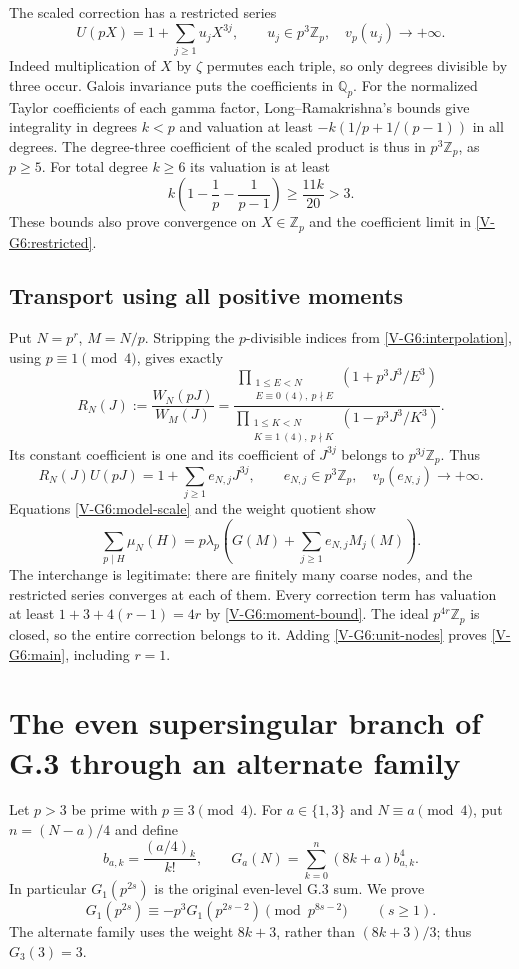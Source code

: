 \documentclass[11pt,letterpaper]{article}
\numberwithin{equation}{section}
\begin{document}
The scaled correction has a restricted series
\begin{equation}\label{V-G6:restricted}
 U(pX)=1+\sum_{j\ge1}u_jX^{3j},\qquad
 u_j\in p^3\mathbb Z_p,\quad v_p(u_j)\longrightarrow+\infty.
\end{equation}
Indeed multiplication of $X$ by $\zeta$ permutes each triple, so
only degrees divisible by three occur. Galois invariance puts the
coefficients in $\mathbb Q_p$.
For the normalized Taylor coefficients of each gamma factor,
Long--Ramakrishna's bounds give integrality in degrees $k<p$ and
valuation at least $-k(1/p+1/(p-1))$ in all degrees.
The degree-three coefficient of the scaled product is thus in
$p^3\mathbb Z_p$, as $p\ge5$. For total degree $k\ge6$ its valuation
is at least
\[
 k\left(1-\frac1p-\frac1{p-1}\right)
 \ge\frac{11k}{20}>3.
\]
These bounds also prove convergence on $X\in\mathbb Z_p$ and the
coefficient limit in \eqref{V-G6:restricted}.

\subsection{Transport using all positive moments}
Put $N=p^r$, $M=N/p$. Stripping the $p$-divisible indices from
\eqref{V-G6:interpolation}, using $p\equiv1\pmod4$, gives exactly
\[
 R_N(J):=\frac{W_N(pJ)}{W_M(J)}
 =\frac{\prod_{\substack{1\le E<N\\E\equiv0\ (4),\ p\nmid E}}
              (1+p^3J^3/E^3)}
 {\prod_{\substack{1\le K<N\\K\equiv1\ (4),\ p\nmid K}}
              (1-p^3J^3/K^3)}.
\]
Its constant coefficient is one and its coefficient of $J^{3j}$
belongs to $p^{3j}\mathbb Z_p$. Thus
\[
 R_N(J)U(pJ)=1+\sum_{j\ge1}e_{N,j}J^{3j},\qquad
 e_{N,j}\in p^3\mathbb Z_p,\quad v_p(e_{N,j})\to+\infty.
\]
Equations \eqref{V-G6:model-scale} and the weight quotient show
\[
 \sum_{p\mid H}\mu_N(H)
 =p\lambda_p\left(G(M)+\sum_{j\ge1}e_{N,j}M_j(M)\right).
\]
The interchange is legitimate: there are finitely many coarse
nodes, and the restricted series converges at each of them.
Every correction term has valuation at least
$1+3+4(r-1)=4r$ by \eqref{V-G6:moment-bound}.
The ideal $p^{4r}\mathbb Z_p$ is closed, so the entire correction
belongs to it. Adding \eqref{V-G6:unit-nodes} proves
\eqref{V-G6:main}, including $r=1$.

\section{The even supersingular branch of G.3 through an alternate family}\label{loc-V-8}
\label{V-sec:g-even-alternate}
Let $p>3$ be prime with $p\equiv3\pmod4$. For $a\in\{1,3\}$ and
$N\equiv a\pmod4$, put $n=(N-a)/4$ and define
\[
 b_{a,k}=\frac{(a/4)_k}{k!},\qquad
 G_a(N)=\sum_{k=0}^{n}(8k+a)b_{a,k}^4.
\]
In particular $G_1(p^{2s})$ is the original even-level G.3 sum.
We prove
\begin{equation}\label{V-Ge:main}
 \boxed{G_1(p^{2s})\equiv-p^3G_1(p^{2s-2})
 \pmod{p^{8s-2}}\qquad(s\ge1).}
\end{equation}
The alternate family uses the weight $8k+3$, rather than
$(8k+3)/3$; thus $G_3(3)=3$.
\end{document}

